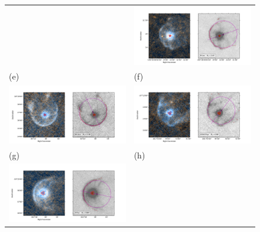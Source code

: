 \begin{figure}
\begin{tabular}{ll}
    & \includegraphics[trim=10 0 65 20, clip]{figs/rleo-imageplot}\\
    (e) & (f) \\
    \includegraphics[trim=10 0 65 20, clip]{figs/uuaur-imageplot}
    & \includegraphics[trim=10 0 65 20, clip]{figs/v1943sgr-imageplot}\\
    (g) & (h) \\
    \includegraphics[trim=10 0 65 20, clip]{figs/xpav-imageplot}

\end{tabular}
\end{figure}
